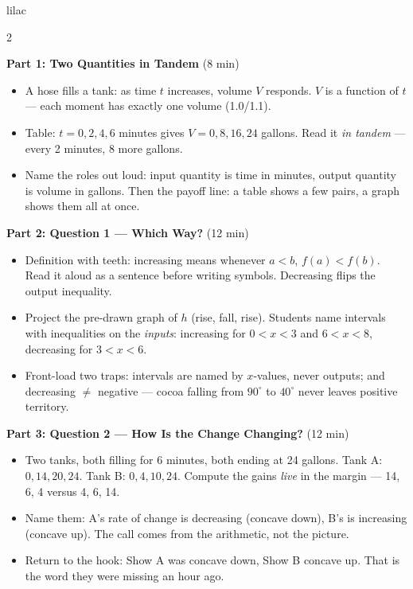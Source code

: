 \documentclass[10pt]{article}
\begin{document}
\begin{skillbox}[Lesson]{lilac}
\begin{multicols}{2}

\textbf{Part 1: Two Quantities in Tandem} (8 min)

\begin{itemize}
  \item A hose fills a tank: as time $t$ increases, volume $V$ responds. $V$
        is a function of $t$ --- each moment has exactly one volume (1.0/1.1).
  \item Table: $t = 0, 2, 4, 6$ minutes gives $V = 0, 8, 16, 24$ gallons.
        Read it \textit{in tandem} --- every 2 minutes, 8 more gallons.
  \item Name the roles out loud: input quantity is time in minutes, output
        quantity is volume in gallons. Then the payoff line: a table shows a
        few pairs, a graph shows them all at once.
\end{itemize}

\textbf{Part 2: Question 1 --- Which Way?} (12 min)

\begin{itemize}
  \item Definition with teeth: increasing means whenever $a < b$,
        $f(a) < f(b)$. Read it aloud as a sentence before writing symbols.
        Decreasing flips the output inequality.
  \item Project the pre-drawn graph of $h$ (rise, fall, rise). Students name
        intervals with inequalities on the \textit{inputs}: increasing for
        $0 < x < 3$ and $6 < x < 8$, decreasing for $3 < x < 6$.
  \item Front-load two traps: intervals are named by $x$-values, never
        outputs; and decreasing $\ne$ negative --- cocoa falling from
        $90^\circ$ to $40^\circ$ never leaves positive territory.
\end{itemize}

\columnbreak

\textbf{Part 3: Question 2 --- How Is the Change Changing?} (12 min)

\begin{itemize}
  \item Two tanks, both filling for 6 minutes, both ending at 24 gallons.
        Tank A: $0, 14, 20, 24$. Tank B: $0, 4, 10, 24$. Compute the gains
        \textit{live} in the margin --- 14, 6, 4 versus 4, 6, 14.
  \item Name them: A's rate of change is decreasing (concave down), B's is
        increasing (concave up). The call comes from the arithmetic, not the
        picture.
  \item Return to the hook: Show A was concave down, Show B concave up. That
        is the word they were missing an hour ago.
\end{itemize}


\end{multicols}
\end{skillbox}
\end{document}
